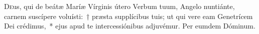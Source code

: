 \lettrine{D}{e}us, qui de beátæ Maríæ Vírginis útero Verbum tuum, Angelo nuntiánte, carnem suscípere voluísti:~† præsta supplícibus tuis; ut qui vere eam Genetrícem Dei crédimus,~* ejus apud te intercessiónibus adjuvémur. Per eumdem Dóminum.